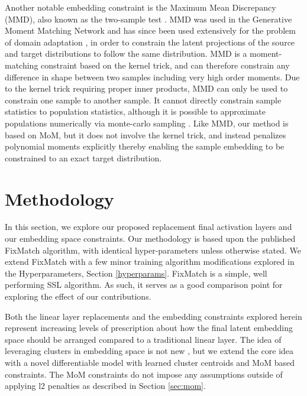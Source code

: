 \documentclass[10pt,twocolumn,letterpaper]{article}
\begin{document}
Another notable embedding constraint is the Maximum Mean Discrepancy (MMD), also known as the two-sample test \cite{gretton2007kernel}.  
MMD was used in the Generative Moment Matching Network \cite{li2015generative} and has since been used extensively for the problem of domain adaptation \cite{WANG2018135,Wang2023rethinking}, in order to constrain the latent projections of the source and target distributions to follow the same distribution.  
MMD is a moment-matching constraint based on the kernel trick, and can therefore constrain any difference in shape between two samples including very high order moments. 
Due to the kernel trick requiring proper inner products, MMD can only be used to constrain one sample to another sample.  
It cannot directly constrain sample statistics to population statistics, although it is possible to approximate populations numerically via monte-carlo sampling \cite{zhao2019infovae}.  
Like MMD, our method is based on MoM, but it does not involve the kernel trick, and instead penalizes polynomial moments explicitly thereby enabling the sample embedding to be constrained to an exact target distribution.






\section{Methodology}

In this section, we explore our proposed replacement final activation layers and our embedding space constraints.
Our methodology is based upon the published FixMatch \cite{sohn2020fixmatch} algorithm, with identical hyper-parameters unless otherwise stated.
We extend FixMatch with a few minor training algorithm modifications explored in the Hyperparameters, Section \ref{hyperparams}.
FixMatch \cite{sohn2020fixmatch} is a simple, well performing SSL algorithm.
As such, it serves as a good comparison point for exploring the effect of our contributions.

Both the linear layer replacements and the embedding constraints explored herein represent increasing levels of prescription about how the final latent embedding space should be arranged compared to a traditional linear layer.
The idea of leveraging clusters in embedding space is not new \cite{caron2018deep,caron2020unsupervised,enguehard2019semi}, but we extend the core idea with a novel differentiable model with learned cluster centroids and MoM based constraints.
The MoM constraints do not impose any assumptions outside of applying l2 penalties as described in Section \ref{sec:mom}.
\end{document}
